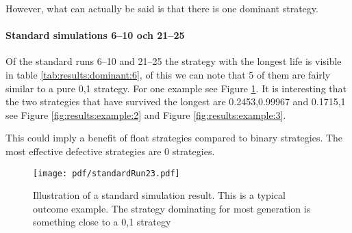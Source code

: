
However, what can actually be said is that there is one dominant strategy.

\paragraph{Standard simulations 6--10 och 21--25}
Of the standard runs 6--10 and 21--25 the strategy with the longest life is visible in table \ref{tab:results:dominant:6}, of this we can note that 5 of them are fairly similar to a pure 0,1 strategy. For one example see Figure \ref{fig:results:example:1}. It is interesting that the two strategies that have survived the longest are 0.2453,0.99967 and 0.1715,1 see Figure \ref{fig:results:example:2}  and Figure \ref{fig:results:example:3}.

This could imply a benefit of float strategies compared to binary strategies. The most effective defective strategies are 0 strategies.


\begin{figure}[htbp]
\centering
\texttt{[image: pdf/standardRun23.pdf]}
\caption{Illustration of a standard simulation result. This is a
  typical outcome example. The strategy dominating for most generation
  is something close to a 0,1 strategy}
\label{fig:results:example:1}
\end{figure}


